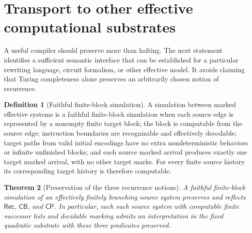 \documentclass[11pt,letterpaper]{article}
\newtheorem{theorem}{Theorem}[section]
\theoremstyle{definition}
\newtheorem{definition}[theorem]{Definition}
\theoremstyle{remark}
\newcommand{\CP}{\mathsf{CP}}
\newcommand{\CB}{\mathsf{CB}}
\newcommand{\REC}{\mathsf{Rec}}
\newcommand{\1}{\mathbf 1}
\newcommand{\srctag}[1]{\texorpdfstring{\hspace{0.4em}{\normalfont\small\color{accent}[source #1]}}{ [source #1]}}
\begin{document}
\section{Transport to other effective computational substrates\srctag{03}}
\label{lbh:qd:sec:transport}

A useful compiler should preserve more than halting. The next statement
identifies a sufficient semantic interface that can be established for a
particular rewriting language, circuit formalism, or other effective model.
It avoids claiming that Turing completeness alone preserves an arbitrarily
chosen notion of recurrence.

\begin{definition}[Faithful finite-block simulation]
A simulation between marked effective systems is a faithful finite-block
simulation when each source edge is represented by a nonempty finite target
block; the block is computable from the source edge; instruction boundaries
are recognizable and effectively decodable; target paths from valid initial
encodings have no extra nondeterministic behaviors or infinite unfinished
blocks; and each source marked arrival produces exactly one target marked
arrival, with no other target marks. For every finite source history its
corresponding target history is therefore computable.
\end{definition}

\begin{theorem}[Preservation of the three recurrence notions]
\label{lbh:qd:thm:transport}
A faithful finite-block simulation of an effectively finitely branching
source system preserves and reflects $\REC$, $\CB$, and $\CP$. In
particular, each such source system with computable finite successor lists
and decidable marking admits an interpretation in the fixed quadratic
substrate with these three predicates preserved.
\end{theorem}
\end{document}
